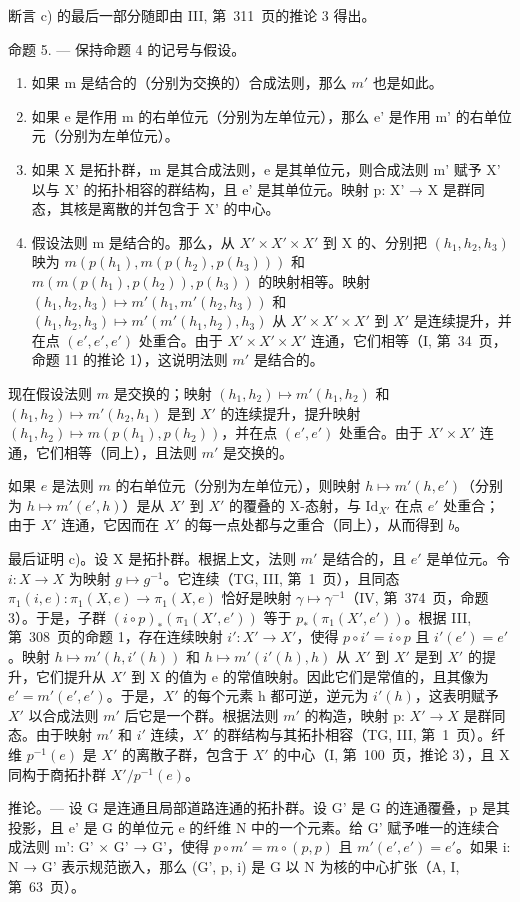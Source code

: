 断言 c) 的最后一部分随即由 III, 第~311~页的推论 3 得出。

命题 5. --- 保持命题 4 的记号与假设。

\begin{enumerate}
\def\labelenumi{\alph{enumi})}
\item
  如果 m 是结合的（分别为交换的）合成法则，那么 \(m'\) 也是如此。
\item
  如果 e 是作用 m 的右单位元（分别为左单位元），那么 e' 是作用 m' 的右单位元（分别为左单位元）。
\item
  如果 X 是拓扑群，m 是其合成法则，e 是其单位元，则合成法则 m' 赋予 X' 以与 X' 的拓扑相容的群结构，且 e' 是其单位元。映射 p: X' → X 是群同态，其核是离散的并包含于 X' 的中心。
\item
  假设法则 m 是结合的。那么，从 \(X' \times X' \times X'\) 到 X 的、分别把 \((h_{1}, h_{2}, h_{3})\) 映为 \(m(p(h_{1}),m(p(h_{2}),p(h_{3})))\) 和 \(m(m(p(h_{1}),p(h_{2})),p(h_{3}))\) 的映射相等。映射 \((h_{1},h_{2},h_{3})\mapsto m'(h_{1},m'(h_{2},h_{3}))\) 和 \((h_{1},h_{2},h_{3})\mapsto m'(m'(h_{1},h_{2}),h_{3})\) 从 \(X'\times X'\times X'\) 到 \(X'\) 是连续提升，并在点 \((e',e',e')\) 处重合。由于 \(X'\times X'\times X'\) 连通，它们相等（I, 第~34~页，命题 11 的推论 1），这说明法则 \(m'\) 是结合的。
\end{enumerate}

现在假设法则 \(m\) 是交换的；映射 \((h_1, h_2) \mapsto m'(h_1, h_2)\) 和 \((h_1, h_2) \mapsto m'(h_2, h_1)\) 是到 \(X'\) 的连续提升，提升映射 \((h_1, h_2) \mapsto m(p(h_1), p(h_2))\)，并在点 \((e', e')\) 处重合。由于 \(X' \times X'\) 连通，它们相等（同上），且法则 \(m'\) 是交换的。

如果 \(e\) 是法则 \(m\) 的右单位元（分别为左单位元），则映射 \(h \mapsto m'(h, e')\)（分别为 \(h \mapsto m'(e', h)\)）是从 \(X'\) 到 \(X'\) 的覆叠的 X-态射，与 \(\text{Id}_{X'}\) 在点 \(e'\) 处重合；由于 \(X'\) 连通，它因而在 \(X'\) 的每一点处都与之重合（同上），从而得到 \(b\)。

最后证明 c)。设 X 是拓扑群。根据上文，法则 \(m'\) 是结合的，且 \(e'\) 是单位元。令 \(i: X \to X\) 为映射 \(g \mapsto g^{-1}\)。它连续（TG, III, 第~1~页），且同态 \(\pi_{1}(i,e): \pi_{1}(X,e) \to \pi_{1}(X,e)\) 恰好是映射 \(\gamma \mapsto \gamma^{-1}\)（IV, 第~374~页，命题 3）。于是，子群 \((i \circ p)_{*}(\pi_{1}(X',e'))\) 等于 \(p_{*}(\pi_{1}(X',e'))\)。根据 III, 第~308~页的命题 1，存在连续映射 \(i': X' \to X'\)，使得 \(p \circ i' = i \circ p\) 且 \(i'(e') = e'\)。映射 \(h \mapsto m'(h,i'(h))\) 和 \(h \mapsto m'(i'(h),h)\) 从 \(X'\) 到 \(X'\) 是到 \(X'\) 的提升，它们提升从 \(X'\) 到 X 的值为 e 的常值映射。因此它们是常值的，且其像为 \(e' = m'(e',e')\)。于是，\(X'\) 的每个元素 h 都可逆，逆元为 \(i'(h)\)，这表明赋予 \(X'\) 以合成法则 \(m'\) 后它是一个群。根据法则 \(m'\) 的构造，映射 p: \(X' \to X\) 是群同态。由于映射 \(m'\) 和 \(i'\) 连续，\(X'\) 的群结构与其拓扑相容（TG, III, 第~1~页）。纤维 \(p^{-1}(e)\) 是 \(X'\) 的离散子群，包含于 \(X'\) 的中心（I, 第~100~页，推论 3），且 X 同构于商拓扑群 \(X'/p^{-1}(e)\)。

推论。--- 设 G 是连通且局部道路连通的拓扑群。设 G' 是 G 的连通覆叠，p 是其投影，且 e' 是 G 的单位元 e 的纤维 N 中的一个元素。给 G' 赋予唯一的连续合成法则 m': G' × G' → G'，使得 \(p \circ m' = m \circ (p, p)\) 且 \(m'(e', e') = e'\)。如果 i: N → G' 表示规范嵌入，那么 (G', p, i) 是 G 以 N 为核的中心扩张（A, I, 第~63~页）。

